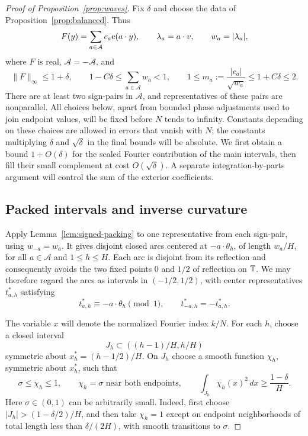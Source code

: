 \begin{proof}[Proof of Proposition~\ref{prop:waves}]
Fix $\delta$ and choose the data of Proposition~\ref{prop:balanced}.
Thus
\[
 F(y)=\sum_{a\in\mathcal A}c_a\mathrm e(a\cdot y),\qquad
 \lambda_a=a\cdot v,\qquad w_a=|\lambda_a|,
\]
where $F$ is real, $\mathcal A=-\mathcal A$, and
\begin{equation}\label{eq:wave-input}
 \|F\|_\infty\le1+\delta,\qquad
 1-C\delta\le\sum_{a\in\mathcal A}w_a<1,\qquad
 1\le m_a:=\frac{|c_a|}{\sqrt{w_a}}\le1+C\delta\le2.
\end{equation}
There are at least two sign-pairs in $\mathcal A$, and representatives of
these pairs are nonparallel.  All choices below, apart from bounded phase
adjustments used to join endpoint values, will be fixed before $N$ tends
to infinity.  Constants depending on these choices are allowed in errors
that vanish with $N$; the constants multiplying $\delta$ and
$\sqrt\delta$ in the final bounds will be absolute.
We first obtain a bound $1+O(\delta)$ for the scaled Fourier contribution
of the main intervals, then fill their small complement at cost
$O(\sqrt\delta)$.  A separate integration-by-parts argument will control
the sum of the exterior coefficients.

\subsection*{Packed intervals and inverse curvature}

Apply Lemma~\ref{lem:signed-packing} to one representative from each
sign-pair, using $w_{-a}=w_a$.  It gives disjoint closed arcs centered at
$-a\cdot\theta_h$, of length $w_a/H$, for all $a\in\mathcal A$ and
$1\le h\le H$.  Each arc is disjoint from its reflection and consequently
avoids the two fixed points $0$ and $1/2$ of reflection on $\mathbb T$.
We may therefore regard the arcs as intervals in $(-1/2,1/2)$, with center
representatives $t^*_{a,h}$ satisfying
\begin{equation}\label{eq:wave-centers}
 t^*_{a,h}\equiv-a\cdot\theta_h\pmod1,\qquad
 t^*_{-a,h}=-t^*_{a,h}.
\end{equation}

The variable $x$ will denote the normalized Fourier index $k/N$.
For each $h$, choose a closed interval
\[
 J_h\subset((h-1)/H,h/H)
\]
symmetric about $x_h^*=(h-1/2)/H$.  On $J_h$ choose a smooth function
$\chi_h$, symmetric about $x_h^*$, such that
\begin{equation}\label{eq:wave-taper}
 \sigma\le\chi_h\le1,\qquad
 \chi_h=\sigma\text{ near both endpoints},\qquad
 \int_{J_h}\chi_h(x)^2\,dx\ge\frac{1-\delta}{H}.
\end{equation}
Here $\sigma\in(0,1)$ can be arbitrarily small.  Indeed, first choose
$|J_h|>(1-\delta/2)/H$, and then take $\chi_h=1$ except on endpoint
neighborhoods of total length less than $\delta/(2H)$, with smooth
transitions to $\sigma$.


\end{proof}
